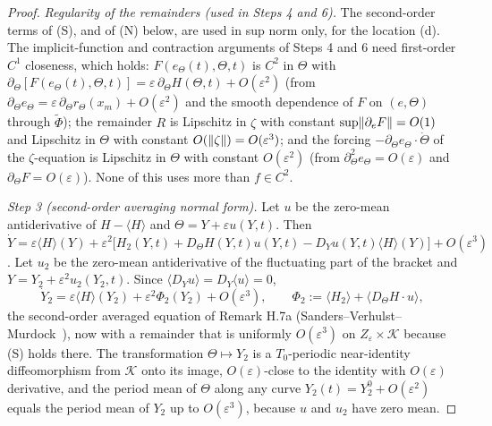 \begin{proof}
\smallskip
\emph{Regularity of the remainders (used in Steps 4 and 6).} The second-order terms of \textup{(S)}, and of
\textup{(N)} below, are used in sup norm only, for the location (d). The implicit-function and contraction arguments
of Steps 4 and 6 need first-order $C^1$ closeness, which holds: $F(e_\Theta(t),\Theta,t)$ is $C^2$ in $\Theta$ with
$\partial_\Theta[F(e_\Theta(t),\Theta,t)] = \varepsilon\,\partial_\Theta H(\Theta,t) + O(\varepsilon^2)$ (from
$\partial_\Theta e_\Theta = \varepsilon\,\partial_\Theta r_\Theta(x_m) + O(\varepsilon^2)$ and the smooth dependence of
$F$ on $(e,\Theta)$ through $\tilde\Phi$); the remainder $R$ is Lipschitz in $\zeta$ with constant
$\sup\lVert \partial_eF\rVert = O(1)$ and Lipschitz in $\Theta$ with constant $O(\lVert \zeta\rVert) = O(\varepsilon^3)$; and the
forcing $-\partial_\Theta e_\Theta\cdot\dot\Theta$ of the $\zeta$-equation is Lipschitz in $\Theta$ with constant
$O(\varepsilon^2)$ (from $\partial^2_\Theta e_\Theta = O(\varepsilon)$ and $\partial_\Theta F = O(\varepsilon)$). None
of this uses more than $f\in C^2$.

\smallskip
\emph{Step 3 (second-order averaging normal form).} Let $u$ be the zero-mean antiderivative of $H - \langle H\rangle$
and $\Theta = Y + \varepsilon u(Y,t)$. Then
$\dot Y = \varepsilon\langle H\rangle(Y) + \varepsilon^2\bigl[H_2(Y,t) + D_\Theta H(Y,t)u(Y,t)
- D_Yu(Y,t)\langle H\rangle(Y)\bigr] + O(\varepsilon^3)$. Let $u_2$ be the zero-mean antiderivative of the
fluctuating part of the bracket and $Y = Y_2 + \varepsilon^2u_2(Y_2,t)$. Since
$\langle D_Yu\rangle = D_Y\langle u\rangle = 0$,
\begin{equation}
  \dot Y_2 = \varepsilon\langle H\rangle(Y_2) + \varepsilon^2\Phi_2(Y_2) + O(\varepsilon^3),\qquad
  \Phi_2 := \langle H_2\rangle + \langle D_\Theta H\cdot u\rangle,
  \tag{N}
\end{equation}
the second-order averaged equation of Remark H.7a (Sanders--Verhulst--Murdock~\cite[\S2.9]{svm2007}), now with a
remainder that is uniformly $O(\varepsilon^3)$ on $Z_\varepsilon\times\mathcal K$ because \textup{(S)} holds there.
The transformation $\Theta\mapsto Y_2$ is a $T_0$-periodic near-identity diffeomorphism from $\mathcal K$ onto its
image, $O(\varepsilon)$-close to the identity with $O(\varepsilon)$ derivative, and the period mean of $\Theta$ along
any curve $Y_2(t) = Y_2^0 + O(\varepsilon^2)$ equals the period mean of $Y_2$ up to $O(\varepsilon^3)$, because $u$
and $u_2$ have zero mean.


\end{proof}
